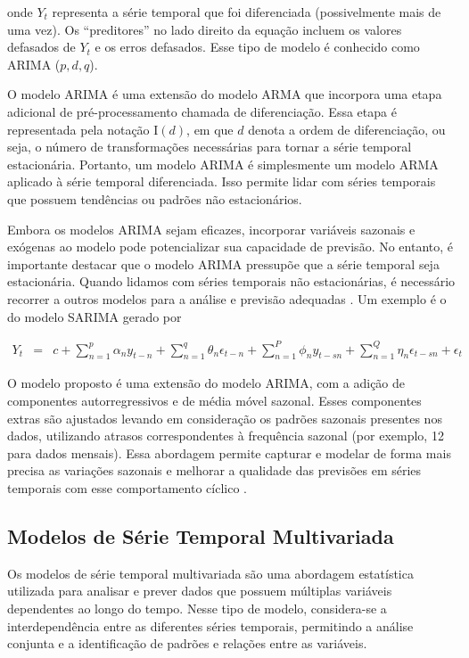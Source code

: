  \noindent onde $Y_t$ representa a série temporal que foi diferenciada (possivelmente mais de uma vez). Os ``preditores'' no lado direito da equação incluem os valores defasados de $Y_t$ e os erros defasados. Esse tipo de modelo é conhecido como ARIMA ($p, d, q$).
 
 O modelo ARIMA é uma extensão do modelo ARMA que incorpora uma etapa adicional de pré-processamento chamada de diferenciação. Essa etapa é representada pela notação I$(d)$, em que $d$ denota a ordem de diferenciação, ou seja, o número de transformações necessárias para tornar a série temporal estacionária. Portanto, um modelo ARIMA é simplesmente um modelo ARMA aplicado à série temporal diferenciada. Isso permite lidar com séries temporais que possuem tendências ou padrões não estacionários.
 
 Embora os modelos ARIMA sejam eficazes, incorporar variáveis sazonais e exógenas ao modelo pode potencializar sua capacidade de previsão. No entanto, é importante destacar que o modelo ARIMA pressupõe que a série temporal seja estacionária. Quando lidamos com séries temporais não estacionárias, é necessário recorrer a outros modelos para a análise e previsão adequadas  \cite{arima}. Um exemplo é o do modelo SARIMA gerado por
 
 
 
 \begin{eqnarray}
 	Y_t&=&c+\sum_{n=1}^p \alpha_n y_{t-n}+\sum_{n=1}^q \theta_n \epsilon_{t-n}+\sum_{n=1}^P \phi_n y_{t-s n}+\sum_{n=1}^Q \eta_n \epsilon_{t-s n}+\epsilon_t \label{sarima}
 \end{eqnarray}
 
 O modelo proposto é uma extensão do modelo ARIMA, com a adição de componentes autorregressivos e de média móvel sazonal. Esses componentes extras são ajustados levando em consideração os padrões sazonais presentes nos dados, utilizando atrasos correspondentes à frequência sazonal (por exemplo, 12 para dados mensais). Essa abordagem permite capturar e modelar de forma mais precisa as variações sazonais e melhorar a qualidade das previsões em séries temporais com esse comportamento cíclico \cite{sarima}.
 
 \subsection{Modelos de S\'erie Temporal Multivariada}\label{subsec:mult}
 
 Os modelos de série temporal multivariada são uma abordagem estatística utilizada para analisar e prever dados que possuem múltiplas variáveis dependentes ao longo do tempo. Nesse tipo de modelo, considera-se a interdependência entre as diferentes séries temporais, permitindo a análise conjunta e a identificação de padrões e relações entre as variáveis. 
 
